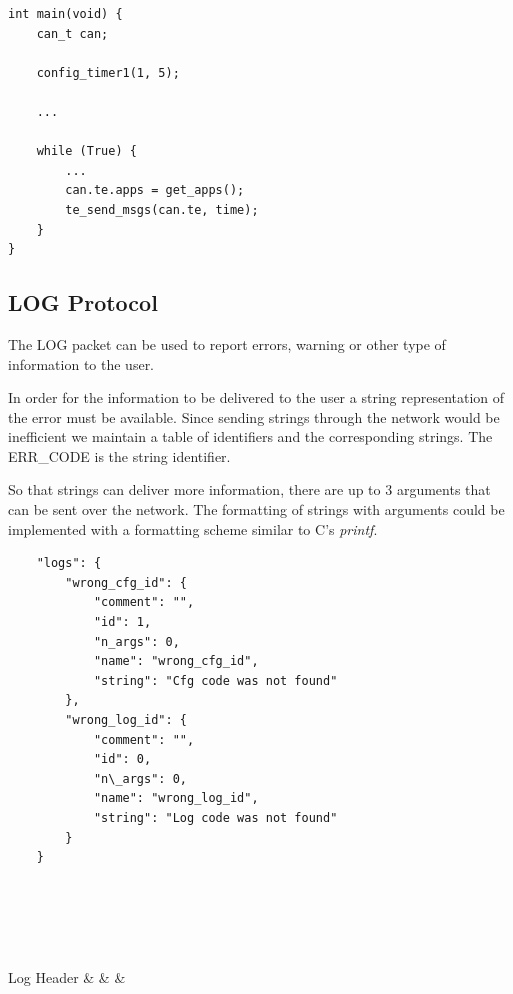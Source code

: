 \documentclass[11pt, a4paper]{article}
\begin{document}
{\begin{verbatim}
int main(void) {
	can_t can;

	config_timer1(1, 5);

	...

	while (True) {
		...
		can.te.apps = get_apps();
		te_send_msgs(can.te, time);
	}
}

\end{verbatim}

\subsection{LOG Protocol}
The LOG packet can be used to report errors, warning or other type of information to the user.

In order for the information to be delivered to the user a string representation of the error must be available. Since sending strings through the network would be inefficient we maintain a table of identifiers and the corresponding strings. The ERR\_CODE is the string identifier.

So that strings can deliver more information, there are up to 3 arguments that can be sent over the network. The formatting of strings with arguments could be implemented with a formatting scheme similar to C's \textit{printf}.

\begin{verbatim}
    "logs": {
        "wrong_cfg_id": {
            "comment": "",
            "id": 1,
            "n_args": 0,
            "name": "wrong_cfg_id",
            "string": "Cfg code was not found"
        },
        "wrong_log_id": {
            "comment": "",
            "id": 0,
            "n\_args": 0,
            "name": "wrong_log_id",
            "string": "Log code was not found"
        }
    }
\end{verbatim}

\\\\
\begin{bytefield}[bitwidth=2.2em]{16}
	 \\
	\begin{rightwordgroup}{Log Header}
		 &  &  & 
	\end{rightwordgroup} \\
	 \\
	 \\
\end{bytefield}

}
\end{document}
